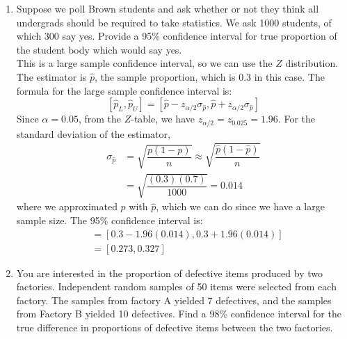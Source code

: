 \documentclass[12pt]{article}
\begin{document}
\begin{enumerate}
\item Suppose we poll Brown students and ask whether or not they think all undergrads should be required to take statistics. We ask 1000 students, of which 300 say yes. Provide a 95\% confidence interval for true proportion of the student body which would say yes.\\

This is a large sample confidence interval, so we can use the $Z$ distribution. The estimator is $\hat{p}$, the sample proportion, which is 0.3 in this case. The formula for the large sample confidence interval is:
\[
[\hat{p}_L, \hat{p}_U] = [ \hat{p} - z_{\alpha/2} \sigma_{\hat{p}}, \hat{p} + z_{\alpha/2} \sigma_{\hat{p}} ]
\]
Since $\alpha = 0.05$, from the $Z$-table, we have $z_{\alpha/2} = z_{0.025} = 1.96$. For the standard deviation of the estimator,
\begin{align*}
\sigma_\hat{p} &= \sqrt{ \dfrac{p(1-p)}{n}} \approx \sqrt{ \dfrac{\hat{p}(1-\hat{p})}{n}}\\
&= \sqrt{ \dfrac{ (0.3)(0.7) }{ 1000 } } = 0.014
\end{align*}
where we approximated $p$ with $\hat{p}$, which we can do since we have a large sample size. The 95\% confidence interval is:
\begin{align*}
[\hat{p}_L, \hat{p}_U] &= [ 0.3 - 1.96(0.014),  0.3 + 1.96(0.014)]\\
&= [0.273, 0.327]
\end{align*}

\item You are interested in the proportion of defective items produced by two factories. Independent random samples of 50 items were selected from each factory. The samples from factory A yielded 7 defectives, and the samples from Factory B yielded 10 defectives. Find a 98\% confidence interval for the true difference in proportions of defective items between the two factories.\\


\end{enumerate}
\end{document}
